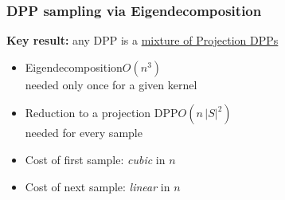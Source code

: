 \documentclass{beamer}
\begin{document}
\begin{frame}
  \frametitle{DPP sampling via Eigendecomposition}
  \textbf{Key result:} any DPP is a \underline{mixture of Projection
    DPPs} \cite{dpp-independence}\pause
  \vspace{1mm}
  \begin{itemize}
  \item  Eigendecomposition\quad $O(n^3)$\\[-2mm]
{\footnotesize needed only once for a given kernel}
\item Reduction to a projection DPP\quad $O(n\,|S|^2)$\\[-2mm]
  {\footnotesize needed for every sample}
    \end{itemize}
    \pause
    \vspace{5mm}
    
    \begin{block}{}
  \begin{itemize}
  \item Cost of first sample: \emph{cubic} in $n$\pause
    \item Cost of next sample: \emph{linear} in $n$
    \end{itemize}
    \end{block}%
    
\end{frame}

  
\end{document}
